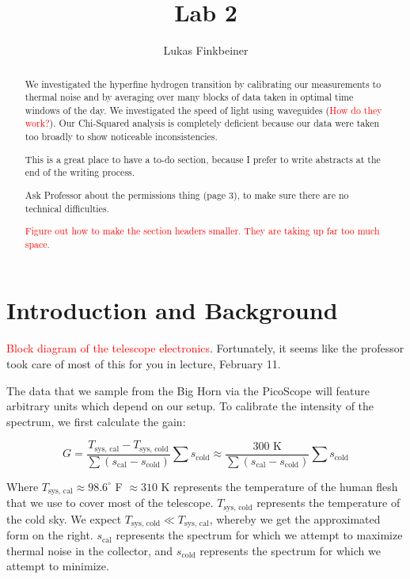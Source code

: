 \documentclass[12pt]{article}
\title{Lab 2}
\author{Lukas Finkbeiner}
\begin{document}
\maketitle

\begin{abstract}

We investigated the hyperfine hydrogen transition by calibrating our measurements to thermal noise and by averaging over many blocks of data taken in optimal time windows of the day. We investigated the speed of light using waveguides (\textcolor{red}{How do they work?}). Our Chi-Squared analysis is completely deficient because our data were taken too broadly to show noticeable inconsistencies.

This is a great place to have a to-do section, because I prefer to write abstracts at the end of the writing process.

\quad * Ask Professor about the permissions thing (page 3), to make sure there are no technical difficulties.

\textcolor{red}{Figure out how to make the section headers smaller. They are taking up far too much space.}

\end{abstract}


\section{Introduction and Background}

\textcolor{red}{Block diagram of the telescope electronics}. Fortunately, it seems like the professor took care of most of this for you in lecture, February 11.



The data that we sample from the Big Horn via the PicoScope will feature arbitrary units which depend on our setup. To calibrate the intensity of the spectrum, we first calculate the gain:

\begin{equation}
G = \frac{T_\text{sys, cal} - T_\text{sys, cold}}{\sum (s_\text{cal} - s_\text{cold})} \sum s_\text{cold} \approx \frac{\text{300 K}}{\sum (s_\text{cal} - s_\text{cold})} \sum s_\text{cold}
\end{equation}

Where $T_\text{sys, cal} \approx 98.6^\circ$ F $\approx 310$ K represents the temperature of the human flesh that we use to cover most of the telescope. $T_\text{sys, cold}$ represents the temperature of the cold sky. We expect $T_\text{sys, cold} \ll T_\text{sys, cal}$, whereby we get the approximated form on the right. $s_\text{cal}$ represents the spectrum for which we attempt to maximize thermal noise in the collector, and $s_\text{cold}$ represents the spectrum for which we attempt to minimize.
\end{document}
